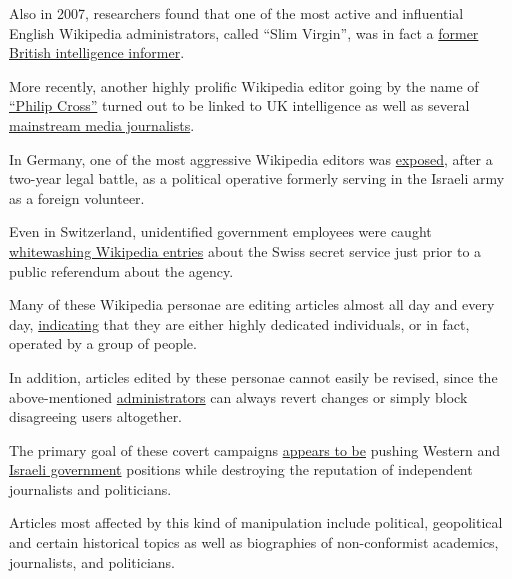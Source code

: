Also in 2007, researchers found that one of the most active and
influential English Wikipedia administrators, called ``Slim Virgin'',
was in fact a
\href{https://web.archive.org/web/20200528235242/http://english.ohmynews.com/articleview/article_view.asp?menu=c10400\&no=374006\&rel_no=1}{former
British intelligence informer}.

More recently, another highly prolific Wikipedia editor going by the
name of
\href{https://www.craigmurray.org.uk/archives/2018/05/the-philip-cross-affair/}{``Philip
Cross''} turned out to be linked to UK intelligence as well as several
\href{https://www.craigmurray.org.uk/archives/2018/05/the-philip-cross-msm-promotion-operation-part-3/}{mainstream
media journalists}.

In Germany, one of the most aggressive Wikipedia editors was
\href{https://swprs.org/ruling-wikipedia-trial/}{exposed}, after a
two-year legal battle, as a political operative formerly serving in the
Israeli army as a foreign volunteer.

Even in Switzerland, unidentified government employees were caught
\href{https://www.heise.de/newsticker/meldung/Beamte-der-Schweizer-Bundesverwaltung-manipulieren-Wikipedia-Texte-3098396.html}{whitewashing
Wikipedia entries} about the Swiss secret service just prior to a public
referendum about the agency.

Many of these Wikipedia personae are editing articles almost all day and
every day,
\href{https://sputniknews.com/analysis/201805161064505256-cross-galloway-wikipedia-obsession/}{indicating}
that they are either highly dedicated individuals, or in fact, operated
by a group of people.

In addition, articles edited by these personae cannot easily be revised,
since the above-mentioned
\href{https://en.wikipedia.org/wiki/Wikipedia:Administrators}{administrators}
can always revert changes or simply block disagreeing users altogether.

The primary goal of these covert campaigns
\href{https://www.mintpressnews.com/phillip-cross-the-mystery-wikipedia-editor-targeting-anti-war-sites/250824/}{appears
to be} pushing Western and
\href{http://www.unz.com/article/how-israel-and-its-partisans-work-to-censor-the-internet/}{Israeli
government} positions while destroying the reputation of independent
journalists and politicians.

Articles most affected by this kind of manipulation include political,
geopolitical and certain historical topics as well as biographies of
non-conformist academics, journalists, and politicians.

